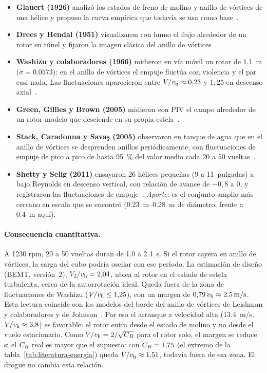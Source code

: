 \begin{itemize}
  \item \textbf{Glauert (1926)} analizó los estados de freno de molino y anillo de
        vórtices de una hélice y propuso la curva empírica que todavía se usa como
        base~\cite{literatura-glauert1926b}.
  \item \textbf{Drees y Hendal (1951)} visualizaron con humo el flujo alrededor de un
        rotor en túnel y fijaron la imagen clásica del anillo de
        vórtices~\cite{literatura-drees1951}.
  \item \textbf{Washizu y colaboradores (1966)} midieron en vía móvil un rotor de
        \SI{1.1}{m} ($\sigma=\num{0.0573}$): en el anillo de vórtices el empuje fluctúa
        con violencia y el par casi nada. Las fluctuaciones aparecieron entre
        $V/v_{\mathrm{h}}\approx0{,}23$ y $1{,}25$ en descenso axial~\cite{literatura-washizu1966}.
  \item \textbf{Green, Gillies y Brown (2005)} midieron con PIV el campo alrededor de un
        rotor modelo que desciende en su propia estela~\cite{literatura-green2005}.
  \item \textbf{Stack, Caradonna y Savaş (2005)} observaron en tanque de agua que en el
        anillo de vórtices se desprenden anillos periódicamente, con fluctuaciones de
        empuje de pico a pico de hasta \SI{95}{\percent} del valor medio cada 20 a 50
        vueltas~\cite{literatura-stack2005}.
  \item \textbf{Shetty y Selig (2011)} ensayaron 26 hélices pequeñas (9 a 11~pulgadas)
        a bajo Reynolds en descenso vertical, con relación de avance de $-0{,}8$ a 0, y
        registraron las fluctuaciones de empuje~\cite{literatura-shetty2011}.
        \emph{Aporte}: es el conjunto amplio más cercano en escala que se encontró
        (\SIrange{0.23}{0.28}{m} de diámetro, frente a \SI{0.4}{m} aquí).
\end{itemize}

\paragraph{Consecuencia cuantitativa.} A \num{1230} rpm, 20 a 50 vueltas duran de
\num{1.0} a \SI{2.4}{s}. Si el rotor cayera en anillo de vórtices, la carga del cubo
podría oscilar con ese período. La estimación de diseño (BEMT, versión~2), $V_2/v_{\mathrm{h}}=2{,}04$, ubica al rotor en
el estado de estela turbulenta, cerca de la autorrotación ideal. Queda fuera de la zona
de fluctuaciones de Washizu ($V/v_{\mathrm{h}}\le1{,}25$), con un margen de
$0{,}79\,v_{\mathrm{h}}\approx\SI{2.5}{m/s}$. Esta lectura coincide con los modelos del borde del anillo de vórtices de
Leishman y colaboradores y de Johnson~\cite{leishman2004,johnson2005}. Por eso el
arranque a velocidad alta (\SI{13.4}{m/s}, $V/v_{\mathrm{h}}\approx3{,}8$) es favorable: el rotor
entra desde el estado de molino y no desde el vuelo estacionario. Como $V/v_{\mathrm{h}}=2/\sqrt{C_{R}}$
para el rotor solo, el margen se reduce si el $C_{R}$ real es mayor que el supuesto: con
$C_{R}=1{,}75$ (el extremo de la tabla~\ref{tab:literatura-energia}) queda
$V/v_{\mathrm{h}}\approx1{,}51$, todavía fuera de esa zona. El drogue no cambia esta relación.

